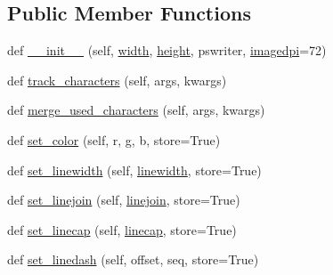 \subsection*{Public Member Functions}
\begin{DoxyCompactItemize}
\item 
def \hyperlink{classmatplotlib_1_1backends_1_1backend__ps_1_1RendererPS_a937f248617d6feed35d1f992e03cf00d}{\+\_\+\+\_\+init\+\_\+\+\_\+} (self, \hyperlink{classmatplotlib_1_1backends_1_1__backend__pdf__ps_1_1RendererPDFPSBase_a55856d35dcfdf98307cb10fb3b1643ba}{width}, \hyperlink{classmatplotlib_1_1backends_1_1__backend__pdf__ps_1_1RendererPDFPSBase_a131284b65ec191c070a364d1e1118555}{height}, pswriter, \hyperlink{classmatplotlib_1_1backends_1_1backend__ps_1_1RendererPS_af5ddad781f61ad35a408149cb1c498bf}{imagedpi}=72)
\item 
def \hyperlink{classmatplotlib_1_1backends_1_1backend__ps_1_1RendererPS_a0ce961d2bc7a0a35468b05402e12b36f}{track\+\_\+characters} (self, args, kwargs)
\item 
def \hyperlink{classmatplotlib_1_1backends_1_1backend__ps_1_1RendererPS_a93150eecc0fd1ef587fc3a129a4f0714}{merge\+\_\+used\+\_\+characters} (self, args, kwargs)
\item 
def \hyperlink{classmatplotlib_1_1backends_1_1backend__ps_1_1RendererPS_a973edafd59fbf6e7b8ce2e6c4a26b9b2}{set\+\_\+color} (self, r, g, b, store=True)
\item 
def \hyperlink{classmatplotlib_1_1backends_1_1backend__ps_1_1RendererPS_a2bb89c768638dcde5becdcc740d9b2f6}{set\+\_\+linewidth} (self, \hyperlink{classmatplotlib_1_1backends_1_1backend__ps_1_1RendererPS_a0cab6a6010b3cce17d8378360d2c9613}{linewidth}, store=True)
\item 
def \hyperlink{classmatplotlib_1_1backends_1_1backend__ps_1_1RendererPS_abe4b5c7ef907a7b7cd43827925dcda6e}{set\+\_\+linejoin} (self, \hyperlink{classmatplotlib_1_1backends_1_1backend__ps_1_1RendererPS_a12770e854540717857c7f98ce02cf472}{linejoin}, store=True)
\item 
def \hyperlink{classmatplotlib_1_1backends_1_1backend__ps_1_1RendererPS_a2fd1b4b9daa9ca74c3c700ed7603de3e}{set\+\_\+linecap} (self, \hyperlink{classmatplotlib_1_1backends_1_1backend__ps_1_1RendererPS_adb33d0ab82babb05eef5425ff90956e1}{linecap}, store=True)
\item 
def \hyperlink{classmatplotlib_1_1backends_1_1backend__ps_1_1RendererPS_af451b5b8ba36d5b8f5a1f7414ef800b3}{set\+\_\+linedash} (self, offset, seq, store=True)
\item 

\end{DoxyCompactItemize}
